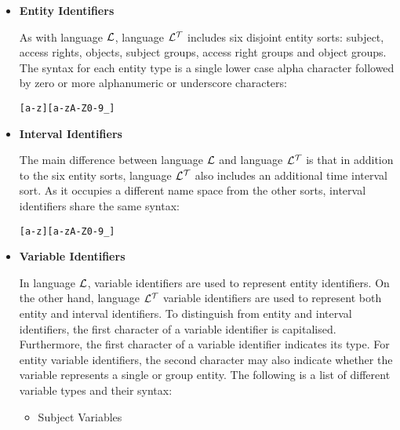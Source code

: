 \documentclass[11pt]{report}
\newenvironment{vverbatim}
{
  \begin{alltt}
}
{
  \vspace{-\baselineskip}
  \end{alltt}
}
\begin{document}
          \begin{itemize}

            \item
              {\bf Entity Identifiers}

              As with language ${\cal L}$, language ${\cal L^T}$ includes six
              disjoint entity sorts: subject, access rights, objects, subject
              groups, access right groups and object groups. The syntax for
              each entity type is a single lower case alpha character followed
              by zero or more alphanumeric or underscore characters:

              \begin{vverbatim}
  [a-z][a-zA-Z0-9\_]
              \end{vverbatim}

            \item
              {\bf Interval Identifiers}

              The main difference between language ${\cal L}$ and language
              ${\cal L^T}$ is that in addition to the six entity sorts,
              language ${\cal L^T}$ also includes an additional time interval
              sort. As it occupies a different name space from the other sorts,
              interval identifiers share the same syntax:

              \begin{vverbatim}
  [a-z][a-zA-Z0-9\_]
              \end{vverbatim}

            \item
              {\bf Variable Identifiers}

              In language ${\cal L}$, variable identifiers are used to
              represent entity identifiers. On the other hand, language
              ${\cal L^T}$ variable identifiers are used to represent both
              entity and interval identifiers. To distinguish from entity and
              interval identifiers, the first character of a variable
              identifier is capitalised. Furthermore, the first character of
              a variable identifier indicates its type. For entity variable
              identifiers, the second character may also indicate whether the
              variable represents a single or group entity. The following is a
              list of different variable types and their syntax:

              \begin{itemize}
                \item
                  Subject Variables


\end{itemize}
\end{itemize}
\end{document}
